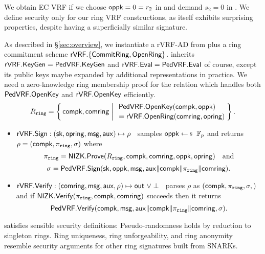 \noindent We obtain EC VRF if we choose $\mathsf{oppk} = 0 = r_2$ in \Sign and demand $s_2 = 0$ in \Verify.
We define security only for our ring VRF constructions, as \PedVRF itself
exhibits surprising properties, despite having a superficially similar signature.

\smallskip

As described in \S\ref{sec:overview},
we instantiate a rVRF-AD from \PedVRF plus a ring commitment scheme
 ${\mathsf{rVRF}}.\{ {\mathsf{CommitRing}}, {\mathsf{OpenRing}} \}$.
\rVRF inherits ${\mathsf{rVRF}}.{\mathsf{KeyGen}} = {\mathsf{PedVRF}}.{\mathsf{KeyGen}}$ and
 ${\mathsf{rVRF}}.{\mathsf{Eval}} = {\mathsf{PedVRF}}.{\mathsf{Eval}}$ of course,
except its public keys maybe expanded by additional representations in practice.
We need a zero-knowledge ring membership proof for the relation \Lring
which handles both ${\mathsf{PedVRF}}.{\mathsf{OpenKey}}$ and ${\mathsf{rVRF}}.{\mathsf{OpenKey}}$ efficiently.
$$ \Lring = \Setst{ \compk, \comring }{
    \eprint{ \exists \openpk,\openring \textrm{\ s.t.\ } }{}
    \genfrac{}{}{0pt}{}{\PedVRF.\OpenKey(\compk,\openpk) \quad}{\,\, = \rVRF.\OpenRing(\comring,\openring)}
} \mathperiod $$

\begin{itemize}
\item ${\mathsf{rVRF}}.{\mathsf{Sign}} : (\mathsf{sk},\mathsf{opring},\mathsf{msg},\mathsf{aux}) \mapsto \rho$ \,
 samples $\openpk \leftsample \F_p$ and
 returns $\rho = (\mathsf{compk},\pi_{\mathtt{ring}},\sigma)$ where      %
 $$ \pi_{\mathtt{ring}} = {\mathsf{NIZK}}.{\mathsf{Prove}}(R_{\mathtt{ring}},\mathsf{compk},\mathsf{comring},\mathsf{oppk},\mathsf{opring}) \quad\textrm{and} $$
 $$ \sigma = {\mathsf{PedVRF}}.{\mathsf{Sign}}(\mathsf{sk},\mathsf{oppk},\mathsf{msg},\mathsf{aux} \| \mathsf{compk} \| \pi_{\mathtt{ring}} \| \mathsf{comring}) . $$ %
\item ${\mathsf{rVRF}}.{\mathsf{Verify}} : (\mathsf{comring},\mathsf{msg},\mathsf{aux},\rho) \mapsto {\ensuremath{\mathsf{out}}} \,\, \lor \perp$ \,
 parses $\rho$ as $(\mathsf{compk},\pi_{\mathtt{ring}},\sigma,)$ and
 if ${\mathsf{NIZK}}.{\mathsf{Verify}}(\pi_{\mathtt{ring}},\mathsf{compk},\mathsf{comring})$ succeeds then it returns
 $$ {\mathsf{PedVRF}}.{\mathsf{Verify}}(\mathsf{compk},\mathsf{msg},\mathsf{aux} \| \mathsf{compk} \| \pi_{\mathtt{ring}} \| \mathsf{comring},\sigma) . $$
\end{itemize}

\rVRF satisfies sensible security definitions:
Pseudo-randomness holds by reduction to singleton rings.
Ring uniqueness, ring unforgeability, and ring anonymity resemble security
arguments for other ring signatures built from SNARKs.
%
%


